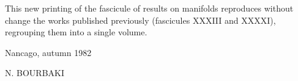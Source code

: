 
This new printing of the fascicule of results on manifolds reproduces without change the works published previously (fascicules XXXIII and XXXXI), regrouping them into a single volume.

Nancago, autumn 1982

N. BOURBAKI

